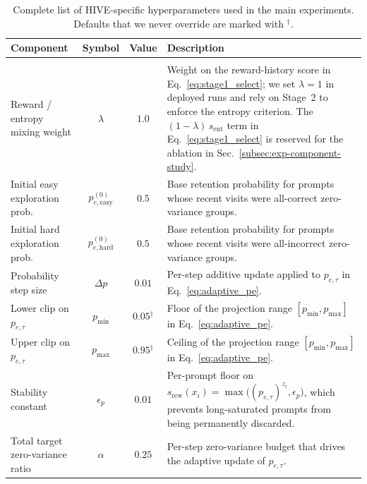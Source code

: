 \begin{table}[t]
\centering
\footnotesize
\setlength{\tabcolsep}{4pt}
\caption{Complete list of HIVE-specific hyperparameters used in the main experiments. Defaults that we never override are marked with $^{\dagger}$.}
\label{tab:hive-hyperparams}
\begin{tabular}{>{\raggedright\arraybackslash}p{3.9cm} c c >{\raggedright\arraybackslash}p{6.1cm}}
\toprule
\textbf{Component} & \textbf{Symbol} & \textbf{Value} & \textbf{Description} \\
\midrule
\multicolumn{4}{l}{\textit{Stage~1: history-informed selection}} \\
\midrule
Reward / entropy mixing weight        & $\lambda$              & $1.0$      & Weight on the reward-history score in Eq.~\eqref{eq:stage1_select}; we set $\lambda{=}1$ in deployed runs and rely on Stage~2 to enforce the entropy criterion. The $(1{-}\lambda)\,s_{\mathrm{ent}}$ term in Eq.~\eqref{eq:stage1_select} is reserved for the ablation in Sec.~\ref{subsec:exp-component-study}. \\
Initial easy exploration prob.        & $p_{e,\mathrm{easy}}^{(0)}$ & $0.5$ & Base retention probability for prompts whose recent visits were all-correct zero-variance groups. \\
Initial hard exploration prob.        & $p_{e,\mathrm{hard}}^{(0)}$ & $0.5$ & Base retention probability for prompts whose recent visits were all-incorrect zero-variance groups. \\
Probability step size                 & $\Delta p$              & $0.01$     & Per-step additive update applied to $p_{e,\tau}$ in Eq.~\eqref{eq:adaptive_pe}. \\
Lower clip on $p_{e,\tau}$            & $p_{\min}$              & $0.05$$^{\dagger}$  & Floor of the projection range $[p_{\min},p_{\max}]$ in Eq.~\eqref{eq:adaptive_pe}. \\
Upper clip on $p_{e,\tau}$            & $p_{\max}$              & $0.95$$^{\dagger}$  & Ceiling of the projection range $[p_{\min},p_{\max}]$ in Eq.~\eqref{eq:adaptive_pe}. \\
Stability constant                    & $\epsilon_{p}$          & $0.01$     & Per-prompt floor on $s_{\mathrm{rew}}(x_i){=}\max\!\big((p_{e,\tau})^{z_i},\epsilon_p\big)$, which prevents long-saturated prompts from being permanently discarded. \\
Total target zero-variance ratio      & $\alpha$                & $0.25$     & Per-step zero-variance budget that drives the adaptive update of $p_{e,\tau}$. \\

\end{tabular}
\end{table}
